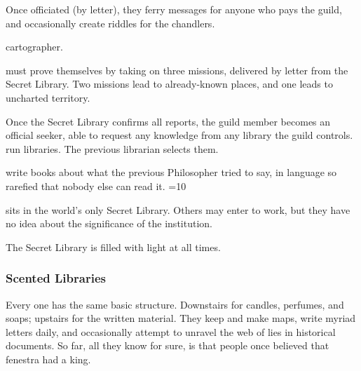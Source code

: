 \begin{multicols}{2}
\begin{description}
  Once officiated (by letter), they ferry messages for anyone who pays the guild, and occasionally create riddles for the chandlers.
  \item[\Glspl{cartographer}]
  \glsdesc{cartographer}.
  \item[\Glspl{seeker}]
  must prove themselves by taking on three missions, delivered by letter from the Secret Library.
  Two missions lead to already-known places, and one leads to uncharted territory.

  Once the Secret Library confirms all reports, the guild member becomes an official \gls{seeker}, able to request any knowledge from any library the guild controls.
  run libraries.
  The previous librarian selects them.
  \item[Philosophers]
  write books about what the previous Philosopher tried to say, in language so rarefied that nobody else can read it.
  \ifnum\value{season}=10
  \item[The Last Librarian]
  sits in the world's only Secret Library.
  Others may enter to work, but they have no idea about the significance of the institution.

  The Secret Library is filled with light at all times.
  \fi
\end{description}

\subsubsection{Scented Libraries}

Every one has the same basic structure.
Downstairs for candles, perfumes, and soaps; upstairs for the written material.
They keep and make maps, write myriad letters daily, and occasionally attempt to unravel the web of lies in historical documents.
So far, all they know for sure, is that people once believed that \gls{fenestra} had a king.

\end{multicols}

